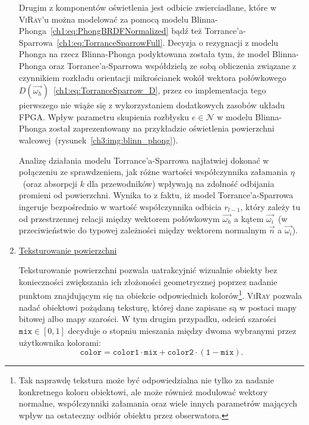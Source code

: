 \begin{enumerate}


Drugim z komponentów oświetlenia jest odbicie zwierciadlane, które w \textsc{ViRay}'u można modelować za pomocą modelu Blinna-Phonga~\eqref{ch1:eq:PhongBRDFNormalized} bądź też Torrance'a-Sparrowa~\eqref{ch1:eq:TorranceSparrowFull}. Decyzja o rezygnacji z modelu Phonga na rzecz Blinna-Phonga podyktowana została tym, że model Blinna-Phonga oraz Torrance'a-Sparrowa współdzielą ze sobą obliczenia związane z czynnikiem rozkładu orientacji mikrościanek wokół wektora połówkowego $D(\vec{\omega_h})$~\eqref{ch1:eq:TorranceSparrow_D}, przez co implementacja tego pierwszego nie wiąże się z wykorzystaniem dodatkowych zasobów układu FPGA. Wpływ parametru skupienia rozbłysku $e \in \mathcal{N}$ w modelu Blinna-Phonga został zaprezentowany na przykładzie oświetlenia powierzchni walcowej~(rysunek~\ref{ch3:img:blinn_phong}).


Analizę działania modelu Torrance'a-Sparrowa najłatwiej dokonać w połączeniu ze sprawdzeniem, jak różne wartości współczynnika załamania $\eta$~(oraz absorpcji $k$ dla przewodników) wpływają na zdolność odbijania promieni od powierzchni. Wynika to z faktu, iż model Torrance'a-Sparrowa ingeruje bezpośrednio w wartość współczynnika odbicia $r_{l-1}$, który zależy tu od przestrzennej relacji między wektorem połówkowym $\vec{\omega_h}$ a kątem $\vec{\omega_i}$~(w przeciwieństwie do typowej zależności między wektorem normalnym $\vec{n}$ a $\vec{\omega_i}$).



\item \underline{Teksturowanie powierzchni}

Teksturowanie powierzchni pozwala uatrakcyjnić wizualnie obiekty bez konieczności zwiększania ich złożoności geometrycznej poprzez nadanie punktom znajdującym się na obiekcie odpowiednich kolorów\footnote{Tak naprawdę tekstura może być odpowiedzialna nie tylko za nadanie konkretnego koloru obiektowi, ale może również modulować wektory normalne, współczynniki załamania oraz wiele innych parametrów mających wpływ na ostateczny odbiór obiektu przez obserwatora.}. \textsc{ViRay} pozwala nadać obiektowi pożądaną teksturę, której dane zapisane są w postaci mapy bitowej albo mapy szarości. W tym drugim przypadku, odcień szarości $\mathtt{mix}\in[0, 1]$ decyduje o stopniu mieszania między dwoma wybranymi przez użytkownika kolorami:
\begin{equation}
\mathtt{color = color1\cdot mix + color2\cdot\left(1 - mix \right)}.
\end{equation}


\end{enumerate}

